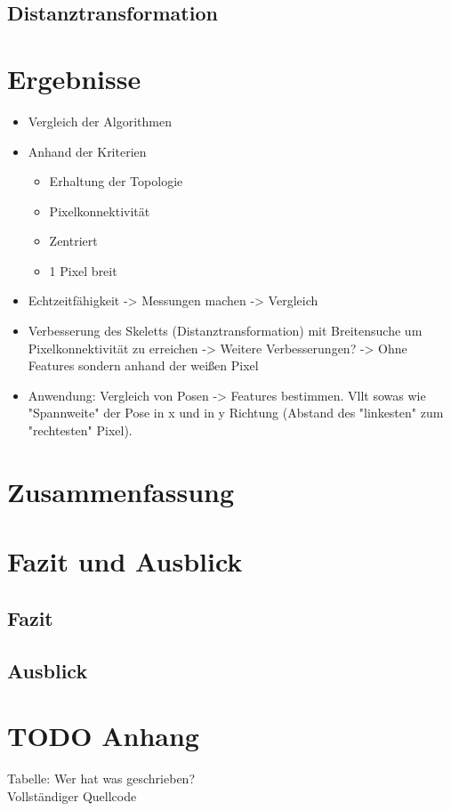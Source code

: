 \documentclass[
	12pt,
	a4paper,
	BCOR10mm,
	DIV14,
	listof=totoc,
	bibliography=totoc,
	headsepline
]{scrreprt}
\begin{document}
\section{Distanztransformation}
\chapter{Ergebnisse}
\begin{itemize}
	\item Vergleich der Algorithmen
	\item Anhand der Kriterien
	\begin{itemize}
		\item Erhaltung der Topologie
		\item Pixelkonnektivität
		\item Zentriert
		\item 1 Pixel breit
	\end{itemize}
	\item Echtzeitfähigkeit -> Messungen machen -> Vergleich
	\item Verbesserung des Skeletts (Distanztransformation) mit Breitensuche um Pixelkonnektivität zu erreichen -> Weitere Verbesserungen? -> Ohne Features sondern anhand der weißen Pixel
	\item Anwendung: Vergleich von Posen -> Features bestimmen. Vllt sowas wie "Spannweite" der Pose in x und in y Richtung (Abstand des "linkesten" zum "rechtesten" Pixel). 
\end{itemize}
\chapter{Zusammenfassung}
\chapter{Fazit und Ausblick}
\section{Fazit}
\section{Ausblick}
\chapter{TODO Anhang}
Tabelle: Wer hat was geschrieben?\\
Vollständiger Quellcode
\end{document}
